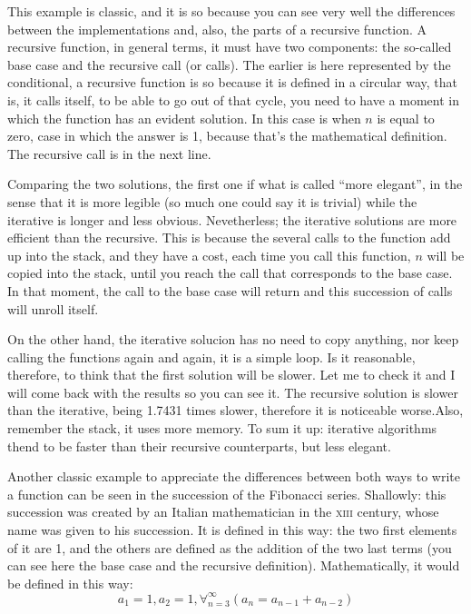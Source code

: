 \documentclass[a4paper]{article}
\begin{document}
This example is classic, and it is so because you can see very well the
differences between the implementations and, also, the parts of a recursive
function. A recursive function, in general terms, it must have two components:
the so-called base case and the recursive call (or calls).
The earlier is here represented by the conditional, a recursive function is
so because it is defined in a circular way, that is, it calls itself, to be able
to go out of that cycle, you need to have a moment in which the function has an
evident solution. In this case is when $n$ is equal to zero, case in which the
answer is 1, because that's the mathematical definition. The recursive call is
in the next line.

Comparing the two solutions, the first one if what is called ``more elegant'',
in the sense that it is more legible (so much one could say it is trivial) while
the iterative is longer and less obvious. Nevetherless; the iterative solutions
are more efficient than the recursive. This is because the several calls to the
function add up into the stack, and they have a cost, each time you call this
function, $n$ will be copied into the stack, until you reach the call that
corresponds to the base case. In that moment, the call to the base case will
return and this succession of calls will unroll itself.

On the other hand, the iterative solucion has no need to copy anything,
nor keep calling the functions again and again, it is a simple loop. Is it
reasonable, therefore, to think that the first solution will be slower. Let me
to check it and I will come back with the results so you can see it. The
recursive solution is slower than the iterative, being 1.7431 times slower,
therefore it is noticeable worse.Also, remember the stack, it uses more memory.
To sum it up: iterative algorithms thend to be faster than their recursive
counterparts, but less elegant.

Another classic example to appreciate the differences between both ways to write
a function can be seen in the succession of the Fibonacci series. Shallowly:
this succession was created by an Italian mathematician in the \textsc{xiii}
century, whose name was given to his succession. It is defined in this way:
the two first elements of it are 1, and the others are defined as the addition
of the two last terms (you can see here the base case and the recursive
definition). Mathematically, it would be defined in this way:
$$
a_1 = 1, a_2 = 1, \forall_{n=3}^{\infty}\left(a_n = a_{n-1} + a_{n-2}\right)
$$
\end{document}
